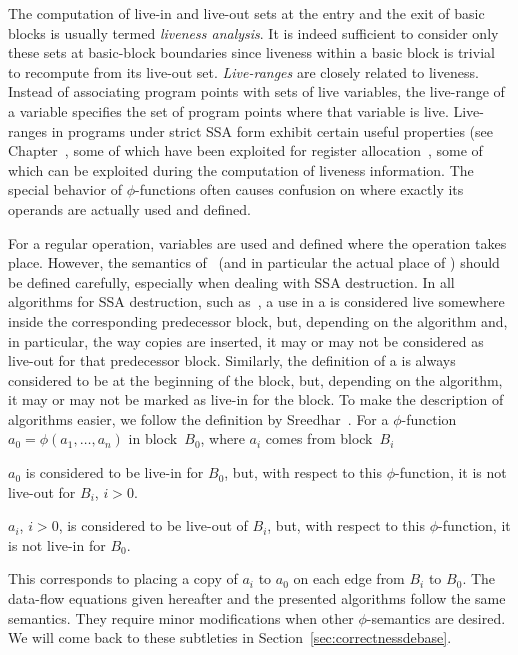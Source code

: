 The computation of live-in and live-out sets at the entry and the exit of basic blocks is usually termed \emph{liveness analysis}.
It is indeed sufficient to consider only these sets at basic-block boundaries since liveness within a basic block is trivial to recompute from its live-out set.
\emph{Live-ranges} are closely related to liveness.
Instead of associating program points with sets of live variables, the live-range of a variable specifies the set of program points where that variable is live.
Live-ranges in programs under strict SSA form exhibit certain useful properties (see Chapter~, some of which have been exploited for register allocation~\cite{HGG:2006:RA_SSA,bouchez:lcpc}, some of which can be exploited during the computation of liveness information.
The special behavior of $\phi$-functions often causes confusion on where exactly its operands are actually used and defined.

For a regular operation, variables are used and defined where the operation takes place.
However, the semantics of \phifuns\ (and in particular the actual place of \phiuses) should be defined carefully, especially when dealing with SSA destruction.
In all algorithms for SSA destruction, such as~\cite{briggs98practical,sreedhar:ssa,boissinot:2009:ssadestruction}, a use in a \phifun is considered live somewhere inside the corresponding predecessor block, but, depending on the algorithm and, in particular, the way copies are inserted, it may or may not be considered as live-out for that predecessor block.
Similarly, the definition of a \phifun is always considered to be at the beginning of the block, but, depending on the algorithm, it may or may not be marked as live-in for the block.
To make the description of algorithms easier, we follow the definition by Sreedhar~\cite{sreedhar:ssa}.
For a $\phi$-function $a_0 = \phi(a_1, \ldots, a_n)$ in block~$B_0$, where $a_i$ comes from block~$B_i$
\begin{compactitem}
\item
	$a_0$ is considered to be live-in for $B_0$, but, with respect to this $\phi$-function, it is not live-out for $B_i$, $i>0$.
\item
	$a_i$, $i>0$, is considered to be live-out of $B_i$, but, with respect to this $\phi$-function, it is not live-in for $B_0$.
\end{compactitem}
This corresponds to placing a copy of $a_i$ to $a_0$ on each edge from $B_i$ to $B_0$.
The data-flow equations given hereafter and the presented algorithms follow the same semantics.
They require minor modifications when other $\phi$-semantics are desired.
We will come back to these subtleties in Section~\ref{sec:correctnessdebase}.

